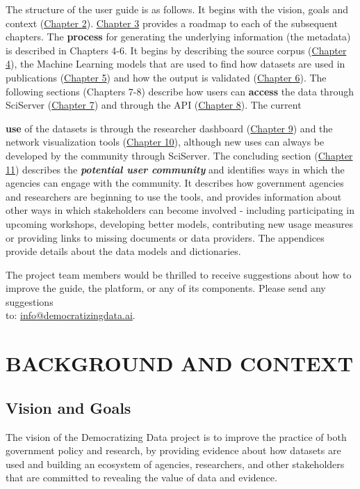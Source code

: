 \documentclass[titlepage, 11pt]{article}
\begin{document}
The structure of the user guide is as follows.   It begins with the vision, goals and context (\hyperref[sec:Chapter2]{Chapter 2}). \hyperref[sec:Chapter3]{Chapter 3} provides a roadmap to each of the subsequent chapters. The {\bf process} for generating the underlying information (the metadata) is described in Chapters 4-6.  It begins by describing the source corpus (\hyperref[sec:Chapter4]{Chapter 4}), the Machine Learning models that are used to find how datasets are used in publications (\hyperref[sec:Chapter5]{Chapter 5}) and how the output is validated (\hyperref[sec:Chapter6]{Chapter 6}).   The following sections (Chapters 7-8) describe how users can {\bf access} the data through SciServer (\hyperref[sec:Chapter7]{Chapter 7}) and through the API (\hyperref[sec:Chapter8]{Chapter 8}).  The current { {\bf use} of the datasets  is through the researcher dashboard (\hyperref[sec:Chapter9]{Chapter 9}) and the network visualization tools (\hyperref[sec:Chapter10]{Chapter 10}), although new uses can always be developed by the community through SciServer.  The concluding section (\hyperref[sec:Chapter11]{Chapter 11}) describes the \textbf{\textit{potential user community}} and identifies ways in which the agencies can engage with the community.  It describes how government agencies and researchers are beginning to use the tools, and provides information about other ways in which stakeholders can become involved - including participating in upcoming workshops, developing better models, contributing new usage measures or providing links to missing documents or data providers.  The appendices provide details about the data models and dictionaries. 


The project team members would be thrilled to receive suggestions about how to improve the guide, the platform, or any of its components. Please send any suggestions \\to: \href{mailto:info@democratizingdata.ai}{info@democratizingdata.ai}.

\section{BACKGROUND AND CONTEXT} 
\label{sec:Chapter2}
\subsection{Vision and Goals}
The vision of the Democratizing Data project is to improve the practice of both government policy and research, by providing evidence about how datasets are used and building an ecosystem of agencies, researchers, and other stakeholders that are committed to revealing the value of data and evidence.

}
\end{document}
